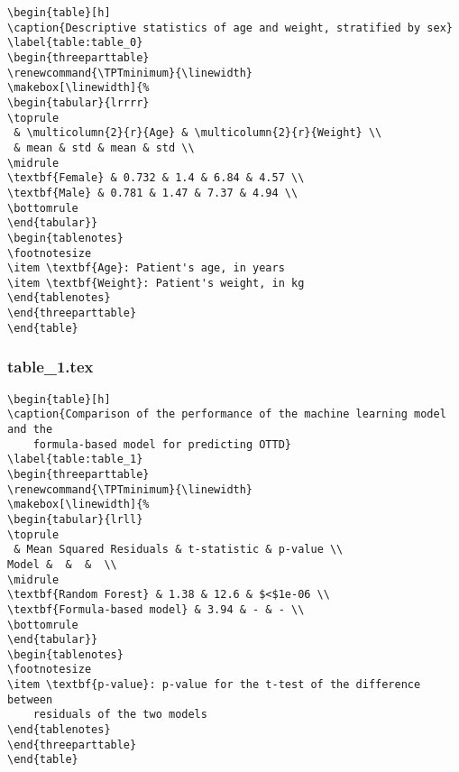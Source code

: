 \documentclass[11pt]{article}
\begin{document}
\begin{Verbatim}[tabsize=4]
\begin{table}[h]
\caption{Descriptive statistics of age and weight, stratified by sex}
\label{table:table_0}
\begin{threeparttable}
\renewcommand{\TPTminimum}{\linewidth}
\makebox[\linewidth]{%
\begin{tabular}{lrrrr}
\toprule
 & \multicolumn{2}{r}{Age} & \multicolumn{2}{r}{Weight} \\
 & mean & std & mean & std \\
\midrule
\textbf{Female} & 0.732 & 1.4 & 6.84 & 4.57 \\
\textbf{Male} & 0.781 & 1.47 & 7.37 & 4.94 \\
\bottomrule
\end{tabular}}
\begin{tablenotes}
\footnotesize
\item \textbf{Age}: Patient's age, in years
\item \textbf{Weight}: Patient's weight, in kg
\end{tablenotes}
\end{threeparttable}
\end{table}

\end{Verbatim}

\subsubsection*{table\_1.tex}

\begin{Verbatim}[tabsize=4]
\begin{table}[h]
\caption{Comparison of the performance of the machine learning model and the
	formula-based model for predicting OTTD}
\label{table:table_1}
\begin{threeparttable}
\renewcommand{\TPTminimum}{\linewidth}
\makebox[\linewidth]{%
\begin{tabular}{lrll}
\toprule
 & Mean Squared Residuals & t-statistic & p-value \\
Model &  &  &  \\
\midrule
\textbf{Random Forest} & 1.38 & 12.6 & $<$1e-06 \\
\textbf{Formula-based model} & 3.94 & - & - \\
\bottomrule
\end{tabular}}
\begin{tablenotes}
\footnotesize
\item \textbf{p-value}: p-value for the t-test of the difference between
	residuals of the two models
\end{tablenotes}
\end{threeparttable}
\end{table}

\end{Verbatim}
\end{document}
